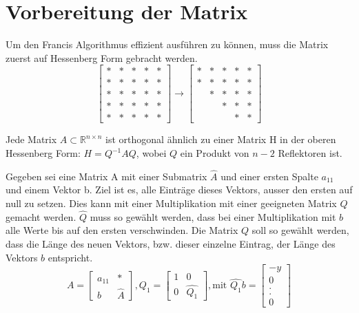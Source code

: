 \section{Vorbereitung der Matrix\label{francis:section:vorbereitung}}
Um den Francis Algorithmus effizient ausführen zu können, muss die Matrix zuerst auf Hessenberg Form gebracht werden.
\begin{equation}
	\begin{bmatrix}
	* & * & * & * & * \\
	* & * & * & * & * \\
	*& * & * & * & * \\
	*&  * & * & * & * \\
	*&  * &  * & * & *
	\end{bmatrix} \rightarrow
	\begin{bmatrix}
	* & * & * & * & * \\
	* & * & * & * & * \\
	& * & * & * & * \\
	&   & * & * & * \\
	&   &   & * & *
	\end{bmatrix}
\end{equation}

\begin{satz}
	Jede Matrix $ A \subset \mathbb{R} ^{n \times n} $ ist orthogonal ähnlich zu einer Matrix H in der oberen Hessenberg Form: $ H=Q^{-1}AQ $, wobei $Q$ ein Produkt von $n-2$ Reflektoren ist.
\end{satz}

Gegeben sei eine Matrix A mit einer Submatrix $\hat{A}$  und einer ersten Spalte $a_{11}$ und einem Vektor b.
Ziel ist es, alle Einträge dieses Vektors, ausser den ersten auf null zu setzen.
Dies kann mit einer Multiplikation mit einer geeigneten Matrix $Q$ gemacht werden. $\hat{Q}$ muss so gewählt werden, dass bei einer Multiplikation mit $b$ alle Werte bis auf den ersten verschwinden.
Die Matrix $Q$ soll so gewählt werden, dass die Länge des neuen Vektors, bzw. dieser einzelne Eintrag, der Länge des Vektors $b$ entspricht.
\begin{equation}
	A=
	\begin{bmatrix}
	a_{11} & *\\
	b & \hat{A}
	\end{bmatrix},
	Q_{1}=
	\begin{bmatrix}
	1 & 0\\
	0 & \hat{Q_1}
	\end{bmatrix},
	\text{mit } \hat{Q_1}b=
	\begin{bmatrix}
	-y\\
	0\\
	.\\
	.\\
	0
	\end{bmatrix}
\end{equation}


